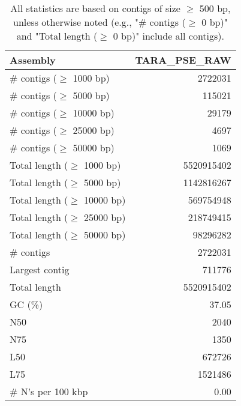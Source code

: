 \documentclass[12pt,a4paper]{article}
\begin{document}
\begin{table}[ht]
\begin{center}
\caption{All statistics are based on contigs of size $\geq$ 500 bp, unless otherwise noted (e.g., "\# contigs ($\geq$ 0 bp)" and "Total length ($\geq$ 0 bp)" include all contigs).}
\begin{tabular}{|l*{1}{|r}|}
\hline
Assembly & TARA\_PSE\_RAW \\ \hline
\# contigs ($\geq$ 1000 bp) & 2722031 \\ \hline
\# contigs ($\geq$ 5000 bp) & 115021 \\ \hline
\# contigs ($\geq$ 10000 bp) & 29179 \\ \hline
\# contigs ($\geq$ 25000 bp) & 4697 \\ \hline
\# contigs ($\geq$ 50000 bp) & 1069 \\ \hline
Total length ($\geq$ 1000 bp) & 5520915402 \\ \hline
Total length ($\geq$ 5000 bp) & 1142816267 \\ \hline
Total length ($\geq$ 10000 bp) & 569754948 \\ \hline
Total length ($\geq$ 25000 bp) & 218749415 \\ \hline
Total length ($\geq$ 50000 bp) & 98296282 \\ \hline
\# contigs & 2722031 \\ \hline
Largest contig & 711776 \\ \hline
Total length & 5520915402 \\ \hline
GC (\%) & 37.05 \\ \hline
N50 & 2040 \\ \hline
N75 & 1350 \\ \hline
L50 & 672726 \\ \hline
L75 & 1521486 \\ \hline
\# N's per 100 kbp & 0.00 \\ \hline
\end{tabular}
\end{center}
\end{table}
\end{document}
